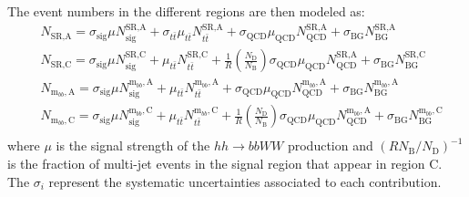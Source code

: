 The event numbers in the different regions are then modeled as:
\begin{align*}
&N_\text{SR,A} = \sigma_\text{sig}\mu N^\text{SR,A}_\text{sig} + \sigma_{t\bar{t}}\mu_{t\bar{t}}N^\text{SR,A}_{t\bar{t}} + \sigma_\text{QCD}\mu_\text{QCD}N^\text{SR,A}_\text{QCD} + \sigma_\text{BG}N^\text{SR,A}_\text{BG} \\
&N_\text{SR,C} = \sigma_\text{sig}\mu N^\text{SR,C}_\text{sig} + \mu_{t\bar{t}}N^\text{SR,C}_{t\bar{t}} + \frac{1}{R}\left(\frac{N_\text{D}}{N_\text{B}}\right)\sigma_\text{QCD}\mu_\text{QCD}N^\text{SR,A}_\text{QCD} + \sigma_\text{BG}N^\text{SR,C}_\text{BG} \\
&N_{\text{m}_{bb},\text{A}} = \sigma_\text{sig}\mu N^{\text{m}_{bb},\text{A}}_\text{sig} + \mu_{t\bar{t}}N^{\text{m}_{bb},\text{A}}_{t\bar{t}} + \sigma_\text{QCD}\mu_\text{QCD}N^{\text{m}_{bb},\text{A}}_\text{QCD} + \sigma_\text{BG}N^{\text{m}_{bb},\text{A}}_\text{BG} \\
&N_{\text{m}_{bb},\text{C}} = \sigma_\text{sig}\mu N^{\text{m}_{bb},\text{C}}_\text{sig} + \mu_{t\bar{t}}N^{\text{m}_{bb},\text{C}}_{t\bar{t}} + \frac{1}{R}\left(\frac{N_\text{D}}{N_\text{B}}\right)\sigma_\text{QCD}\mu_\text{QCD}N^{\text{m}_{bb},\text{A}}_\text{QCD} + \sigma_\text{BG}N^{\text{m}_{bb},\text{C}}_\text{BG} \\
\end{align*}
where $\mu$ is the signal strength of the $hh\rightarrow bbWW$ production %
and $(RN_\text{B}/N_\text{D})^{-1}$ is the
fraction of multi-jet events in the signal region that appear in region C.
The $\sigma_i$ represent the systematic uncertainties associated to each contribution.


